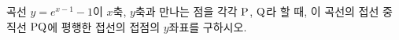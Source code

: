 곡선 $y=e^{x-1}-1$이 $x$축, $y$축과 만나는 점을 각각 $\mathrm{P}$, $\mathrm{Q}$라 할 때, 이 곡선의 접선 중 직선 $\mathrm{PQ}$에 평행한 접선의 접점의 $y$좌표를 구하시오.
